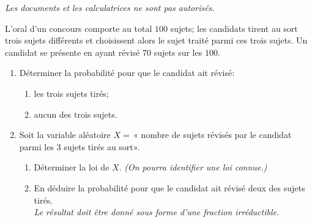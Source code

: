 \documentclass[12pt,reqno]{amsart}
\begin{document}
\ifsolutions\else
\textit{Les documents et les calculatrices ne sont pas autorisés.}
\vspace{7mm}
\fi


\begin{exo}

  L'oral d'un concours comporte au total $100$ sujets; les candidats tirent au sort trois sujets différents et choisissent alors le sujet traité parmi ces trois sujets. Un candidat se présente en ayant révisé $70$ sujets sur les $100$.
  \begin{enumerate}
    \item Déterminer la probabilité pour que le candidat ait révisé:
    \begin{enumerate}
      \item les trois sujets tirés;
      \item aucun des trois sujets.
    \end{enumerate}
    \item Soit la variable aléatoire $X=$\,« nombre de sujets révisés par le candidat parmi les 3 sujets tirés au sort».
    \begin{enumerate}
      \item Déterminer la loi de $X$. \emph{(On pourra identifier une loi connue.)}
      \item En déduire la probabilité pour que le candidat ait révisé deux des sujets tirés.\\
      \emph{Le résultat doit être donné sous forme d'une fraction irréductible.}
    \end{enumerate}
  \end{enumerate}
\end{exo}
\end{document}
